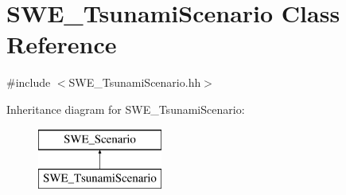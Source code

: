 \hypertarget{classSWE__TsunamiScenario}{\section{S\-W\-E\-\_\-\-Tsunami\-Scenario Class Reference}
\label{classSWE__TsunamiScenario}
}


{\ttfamily \#include $<$S\-W\-E\-\_\-\-Tsunami\-Scenario.\-hh$>$}

Inheritance diagram for S\-W\-E\-\_\-\-Tsunami\-Scenario\-:\begin{figure}[H]
\begin{center}
\leavevmode
\includegraphics[height=2.000000cm]{classSWE__TsunamiScenario}
\end{center}
\end{figure}
